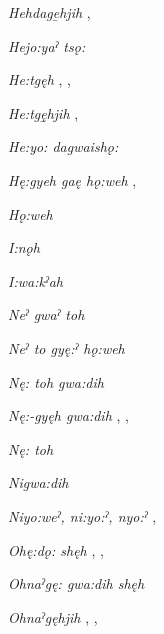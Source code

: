\begin{CayugaRelated}
\item{} \textit{Hehdage̱hjih} , 

\item{} \textit{Hejo:yaˀ tsǫ:} 

\item{} \textit{He:tgęh} , , 

\item{} \textit{He:tgę̱hjih} , 

\item{} \textit{He:yo: dagwaishǫ:} 

\item{} \textit{Hę:gyeh gaę hǫ:weh} , 

\item{} \textit{Hǫ:weh} 

\item{} \textit{I:nǫh} 

\item{} \textit{I:wa:kˀah} 

\item{} \textit{Neˀ gwaˀ toh} 

\item{} \textit{Neˀ to gyę:ˀ hǫ:weh} 

\item{} \textit{Nę: toh gwa:dih} 

\item{} \textit{Nę:-gyęh gwa:dih} , , 

\item{} \textit{Nę: toh} 

\item{} \textit{Nigwa:dih} 

\item{} \textit{Niyo:weˀ, ni:yo:ˀ, nyo:ˀ} , 

\item{} \textit{Ohę:dǫ: shęh} , , 

\item{} \textit{Ohnaˀgę: gwa:dih shęh} 

\item{} \textit{Ohnaˀgęhjih} , , 


\end{CayugaRelated}
